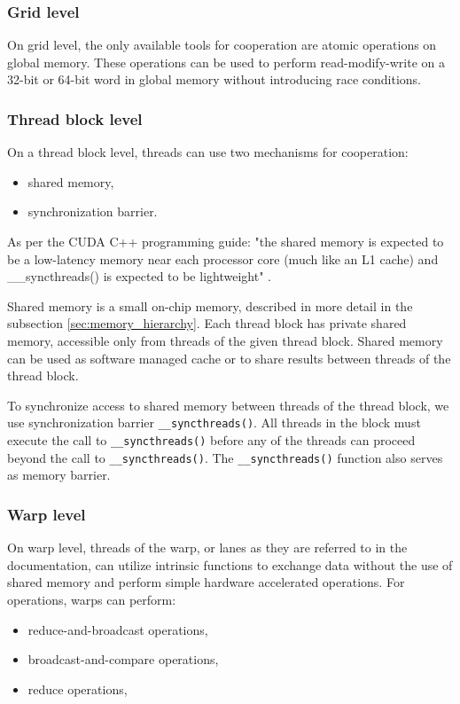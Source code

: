 \subsubsection{Grid level}
On grid level, the only available tools for cooperation are atomic operations on global memory. These operations can be used to perform read-modify-write on a 32-bit or 64-bit word in global memory without introducing race conditions.

\subsubsection{Thread block level}
On a thread block level, threads can use two mechanisms for cooperation:
\begin{itemize}
	\item shared memory,
	\item synchronization barrier.
\end{itemize}

As per the CUDA C++ programming guide: 
"the shared memory is expected to be a low-latency memory near each processor core (much like an L1 cache) and \_\_syncthreads() is expected to be lightweight" \citep{site:cuda}.

Shared memory is a small on-chip memory, described in more detail in the subsection \ref{sec:memory_hierarchy}. Each thread block has private shared memory, accessible only from threads of the given thread block. Shared memory can be used as software managed cache or to share results between threads of the thread block. 

To synchronize access to shared memory between threads of the thread block, we use synchronization barrier \texttt{\_\_syncthreads()}. All threads in the block must execute the call to \texttt{\_\_syncthreads()} before any of the threads can proceed beyond the call to \texttt{\_\_syncthreads()}. 
The \texttt{\_\_syncthreads()} function also serves as memory barrier. %

\subsubsection{Warp level}
On warp level, threads of the warp, or lanes as they are referred to in the documentation, can utilize intrinsic functions to exchange data without the use of shared memory and perform simple hardware accelerated operations. For operations, warps can perform:
\begin{itemize}
	\item reduce-and-broadcast operations,
	\item broadcast-and-compare operations,
	\item reduce operations,
\end{itemize}

